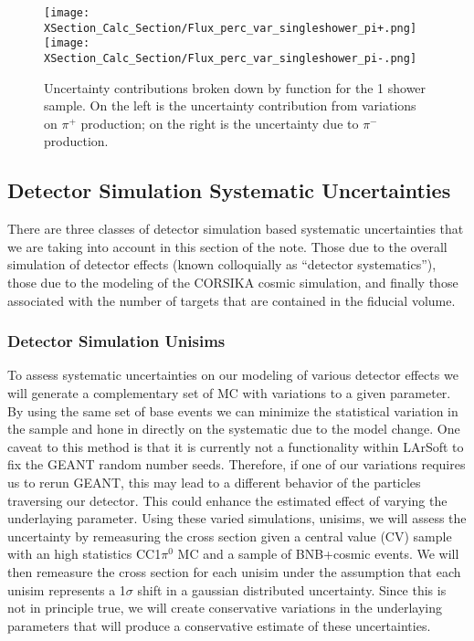 \documentclass{article}
\begin{document}
\begin{figure}[h!]
\centering
\texttt{[image: XSection\_Calc\_Section/Flux\_perc\_var\_singleshower\_pi+.png]}
\texttt{[image: XSection\_Calc\_Section/Flux\_perc\_var\_singleshower\_pi-.png]}
\caption{ Uncertainty contributions broken down by function for the 1 shower sample. On the left is the uncertainty contribution from variations on $\pi^+$ production; on the right is the uncertainty due to $\pi^-$ production. }
\label{fig:flux_1shower_unc_plots_2}
\end{figure}

\clearpage
\subsection{Detector Simulation Systematic Uncertainties}

There are three classes of detector simulation based systematic uncertainties that we are taking into account in this section of the note. Those due to the overall simulation of detector effects (known colloquially as ``detector systematics''), those due to the modeling of the CORSIKA cosmic simulation, and finally those associated with the number of targets that are contained in the fiducial volume.    

\subsubsection{Detector Simulation Unisims}
To assess systematic uncertainties on our modeling of various detector effects we will generate a complementary set of MC with variations to a given parameter. By using the same set of base events we can minimize the statistical variation in the sample and hone in directly on the systematic due to the model change. One caveat to this method is that it is currently not a functionality within LArSoft to fix the GEANT random number seeds. Therefore, if one of our variations requires us to rerun GEANT, this may lead to a different behavior of the particles traversing our detector. This could enhance the estimated effect of varying the underlaying parameter. Using these varied simulations, unisims, we will assess the uncertainty by remeasuring the cross section given a central value (CV) sample with an high statistics CC1$\pi^{0}$ MC and a sample of BNB+cosmic events. We will then remeasure the cross section for each unisim under the assumption that each unisim represents a 1$\sigma$ shift in a gaussian distributed uncertainty. Since this is not in principle true, we will create conservative variations in the underlaying parameters that will produce a conservative estimate of these uncertainties. 
\end{document}
